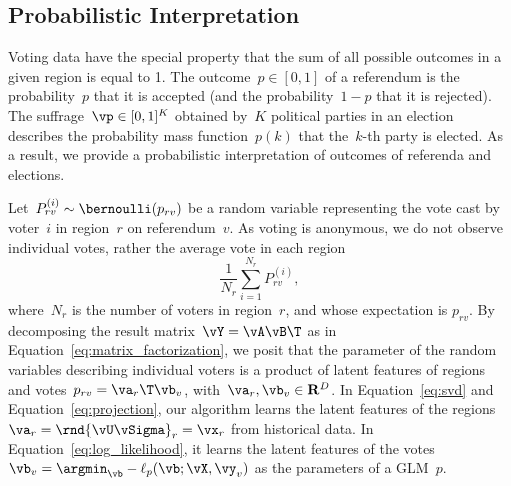 
\subsection{Probabilistic Interpretation}

Voting data have the special property that the sum of all possible outcomes in a given region is equal to 1.
The outcome~$p \in [0, 1]$ of a referendum is the probability~$p$ that it is accepted (and the probability~$1-p$ that it is rejected).
The suffrage~$\vp \in [0, 1]^K$ obtained by~$K$ political parties in an election describes the probability mass function~$p(k)$ that the~$k$-th party is elected.
As a result, we provide a probabilistic interpretation of outcomes of referenda and elections.

Let~$P_{rv}^{(i)} \sim \bernoulli(p_{rv})$ be a random variable representing the vote cast by voter~$i$ in region~$r$ on referendum~$v$.
As voting is anonymous, we do not observe individual votes, rather the average vote in each region
\begin{equation*}
	\frac{1}{N_r} \sum_{i=1}^{N_r} P_{rv}^{(i)},
\end{equation*}
where~$N_r$ is the number of voters in region~$r$, and whose expectation is $p_{rv}$.
By decomposing the result matrix~$\vY = \vA \vB\T$ as in Equation~\eqref{eq:matrix_factorization}, we posit that the parameter of the random variables describing individual voters is a product of latent features of regions and votes~$p_{rv} = \va_r\T \vb_v$, with~$\va_r, \vb_v \in \mathbf{R}^D$.
In Equation~\eqref{eq:svd} and Equation~\eqref{eq:projection}, our algorithm learns the latent features of the regions~$\va_r = \rnd{\vU \vSigma}_r = \vx_r$ from historical data.
In Equation~\eqref{eq:log_likelihood}, it learns the latent features of the votes~$\vb_v = \argmin_{\vb} -\ell_p(\vb ; \vX, \vy_v)$ as the parameters of a GLM~$p$.

